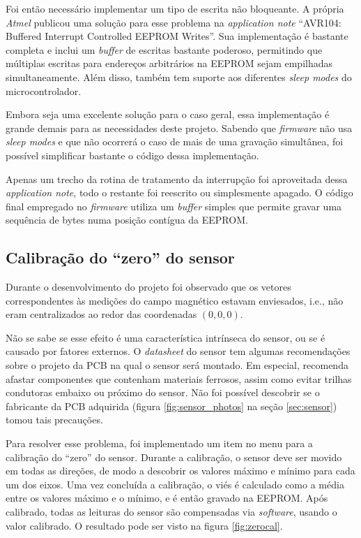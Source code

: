 \documentclass[brazil,pagestart=firstchapter]{abnt}
\makeatletter
\newcommand*{\ie}{i.e.\@\xspace}
\makeatother
\begin{document}
Foi então necessário implementar um tipo de escrita não bloqueante.
A própria \textit{Atmel} publicou uma solução para esse problema na
\textit{application note} ``AVR104: Buffered Interrupt Controlled EEPROM
Writes''. \cite{AVR104} Sua implementação é bastante completa e inclui um
\textit{buffer} de escritas bastante poderoso, permitindo que múltiplas
escritas para endereços arbitrários na \ac{EEPROM} sejam empilhadas
simultaneamente. Além disso, também tem suporte aos diferentes \textit{sleep
modes} do microcontrolador. \cite[p.~33]{ATmega8}

Embora seja uma excelente solução para o caso geral, essa implementação
é grande demais para as necessidades deste projeto.
Sabendo que \textit{firmware} não usa \textit{sleep modes} e que não
ocorrerá o caso de mais de uma gravação simultânea, foi possível simplificar
bastante o código dessa implementação.

Apenas um trecho da rotina de tratamento da interrupção foi aproveitada
dessa \textit{application note}, todo o restante foi reescrito ou
simplesmente apagado.  O código final empregado no \textit{firmware} utiliza
um \textit{buffer} simples que permite gravar uma sequência de bytes numa
posição contígua da \ac{EEPROM}.


\subsection{Calibração do ``zero'' do sensor}
\label{sub:zerocal}

Durante o desenvolvimento do projeto foi observado que os vetores
correspondentes às medições do campo magnético estavam enviesados, \ie, não
eram centralizados ao redor das coordenadas $(0, 0, 0)$.

Não se sabe se esse efeito é uma característica intrínseca do sensor, ou se
é causado por fatores externos. O \textit{datasheet} do sensor tem algumas
recomendações sobre o projeto da \ac{PCB} na qual o sensor será montado. Em
especial, recomenda afastar componentes que contenham materiais ferrosos,
assim como evitar trilhas condutoras embaixo ou próximo do sensor.
\cite[p.~5]{HMC5883L} Não foi possível descobrir se o fabricante da \ac{PCB}
adquirida (figura \ref{fig:sensor_photos} na seção
\ref{sec:sensor}) tomou tais precauções.

Para resolver esse problema, foi implementado um item no menu para
a calibração do ``zero'' do sensor. Durante a calibração, o sensor deve ser
movido em todas as direções, de modo a descobrir os valores máximo e mínimo
para cada um dos eixos. Uma vez concluída a calibração, o viés é calculado
como a média entre os valores máximo e o mínimo, e é então gravado na
\ac{EEPROM}. Após calibrado, todas as leituras do sensor são compensadas via
\textit{software}, usando o valor calibrado. O resultado pode ser visto na
figura \ref{fig:zerocal}.
\end{document}

